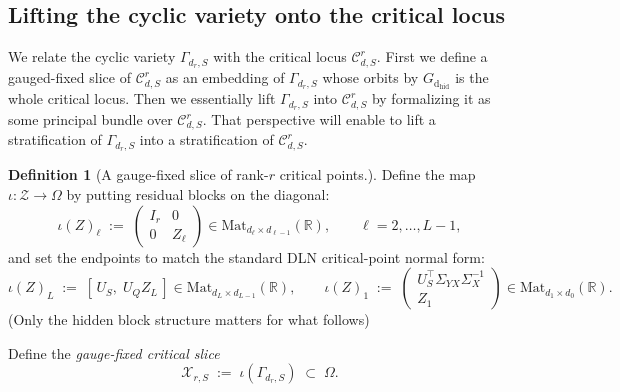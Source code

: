 \documentclass{article}
\newcommand{\dhid}{\operatorname{d_{hid}}}
\newcommand{\R}{\mathbb{R}}
\newcommand{\Mat}{\mathrm{Mat}}
\theoremstyle{definition}
\newtheorem{definition}[theorem]{Definition}
\begin{document}
\subsection{Lifting the cyclic variety onto the critical locus}
We relate the cyclic variety $\Gamma_{d_r,S}$ with the critical locus $\mathcal{C}^r_{d,S}$. First we define a gauged-fixed slice of $\mathcal{C}^r_{d,S}$ as an embedding of $\Gamma_{d_r,S}$ whose orbits by $G_{\dhid}$ is the whole critical locus. Then we essentially lift $\Gamma_{d_r,S}$ into $\mathcal{C}^r_{d,S}$ by formalizing it as some principal bundle over $\mathcal{C}^r_{d,S}$. That perspective will enable to lift a stratification of $\Gamma_{d_r,S}$ into a stratification of $\mathcal{C}^r_{d,S}$.
\begin{definition}[A gauge-fixed slice of rank-$r$ critical points.]
    Define the map $\iota:\mathcal Z\to \Omega$ by putting residual blocks on the diagonal:
\begin{equation}\label{eq:iota-Z}
\iota(Z)_\ell \;:=\;
\begin{pmatrix}
I_r & 0\\
0 & Z_\ell
\end{pmatrix}
\in \Mat_{d_\ell\times d_{\ell-1}}(\R),
\qquad \ell=2,\dots,L-1,
\end{equation}
and set the endpoints to match the standard DLN critical-point normal form:
\begin{equation}\label{eq:endpoints-slice}
\iota(Z)_L \;:=\; [\,U_S,\; U_Q Z_L\,]\in \Mat_{d_L\times d_{L-1}}(\R),
\qquad
\iota(Z)_1 \;:=\;
\begin{pmatrix}
U_S^\top \Sigma_{YX}\Sigma_X^{-1}\\
Z_1
\end{pmatrix}
\in \Mat_{d_1\times d_0}(\R).
\end{equation}
(Only the hidden block structure matters for what follows)
\end{definition}
\noindent
Define the \emph{gauge-fixed critical slice}
\begin{equation}\label{eq:Scrit-def}
 \mathcal{X}_{r, S} \;:=\; \iota(\Gamma_{d_r,S}) \;\subset\; \Omega .
\end{equation}
\end{document}
